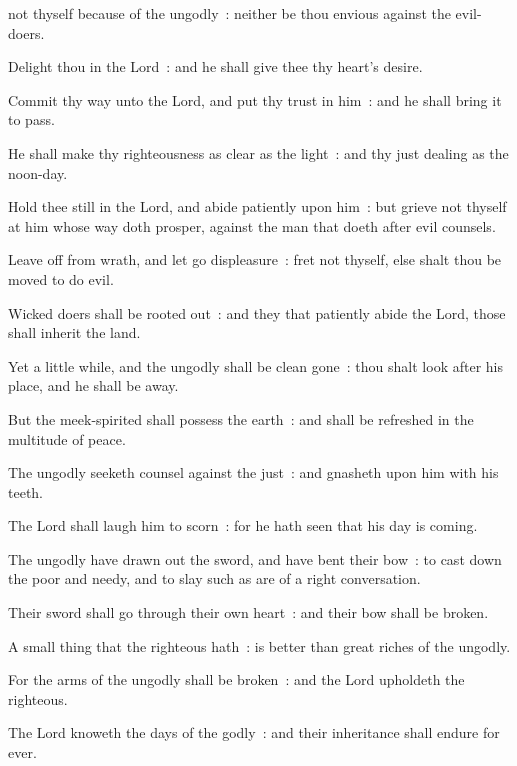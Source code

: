  not thyself because of the ungodly~: neither be thou envious against the evil-doers.\par
{}
Delight thou in the Lord~: and he shall give thee thy heart's desire.\par
{}Commit thy way unto the Lord, and put thy trust in him~: and he shall bring it to pass.\par
{}He shall make thy righteousness as clear as the light~: and thy just dealing as the noon-day.\par
{}Hold thee still in the Lord, and abide patiently upon him~: but grieve not thyself at him whose way doth prosper, against the man that doeth after evil counsels.\par
{}Leave off from wrath, and let go displeasure~: fret not thyself, else shalt thou be moved to do evil.\par
{}Wicked doers shall be rooted out~: and they that patiently abide the Lord, those shall inherit the land.\par
{}Yet a little while, and the ungodly shall be clean gone~: thou shalt look after his place, and he shall be away.\par
{}But the meek-spirited shall possess the earth~: and shall be refreshed in the multitude of peace.\par
{}The ungodly seeketh counsel against the just~: and gnasheth upon him with his teeth.\par
{}The Lord shall laugh him to scorn~: for he hath seen that his day is coming.\par
{}The ungodly have drawn out the sword, and have bent their bow~: to cast down the poor and needy, and to slay such as are of a right conversation.\par
{}Their sword shall go through their own heart~: and their bow shall be broken.\par
{}A small thing that the righteous hath~: is better than great riches of the ungodly.\par
{}For the arms of the ungodly shall be broken~: and the Lord upholdeth the righteous.\par
{}The Lord knoweth the days of the godly~: and their inheritance shall endure for ever.\par
